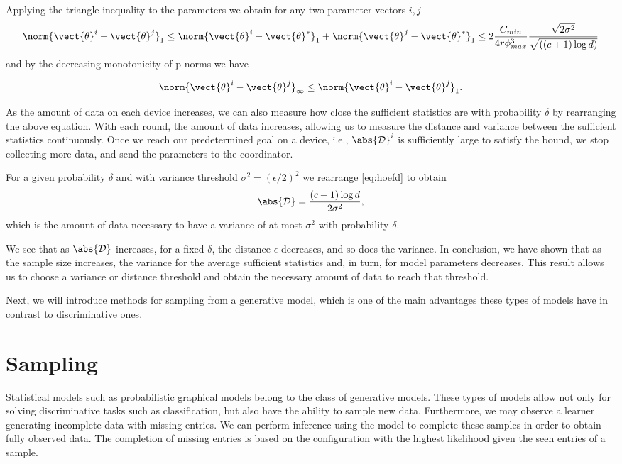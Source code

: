 Applying the triangle inequality to the parameters we obtain for any two parameter vectors $i,j$
\begin{equation}
    \norm{\vect{\theta}^i- \vect{\theta}^j}_1 \leq  \norm{\vect{\theta}^i - \vect{\theta}^*}_1  +  \norm{\vect{\theta}^j- \vect{\theta}^*}_1 \leq 2 \frac{C_{min}}{4r\phi^3_{max}} \frac{\sqrt{2\sigma^2}}{\sqrt{((c+1) \log d)}}
\end{equation}
and by the decreasing monotonicity of p-norms \cite{raissouli2010various} we have

\begin{equation}
    \norm{\vect{\theta}^i- \vect{\theta}^j}_{\infty}  \leq \norm{\vect{\theta}^i- \vect{\theta}^j}_1.
\end{equation}

As the amount of data on each device increases, we can also measure how close the sufficient statistics are with probability $\delta$ by rearranging the above equation. 
With each round, the amount of data increases, allowing us to measure the distance and variance between the sufficient statistics continuously.
Once we reach our predetermined goal on a device, i.e., $\abs{\mathcal{D}}^i$ is sufficiently large to satisfy the bound, we stop collecting more data, and send the parameters to the coordinator.

For a given probability $\delta$ and with variance threshold $\sigma^2 = (\epsilon/2)^2$ we rearrange \autoref{eq:hoefd} to obtain 
\begin{equation}
    \abs{\mathcal{D}} = \frac{(c+1) \log d}{2 \sigma^2},
\end{equation} 
which is the amount of data necessary to have a variance of at most $\sigma^2$ with probability $\delta$.

We see that as $\abs{\mathcal{D}}$ increases, for a fixed $\delta$, the distance $\epsilon$ decreases, and so does the variance. 
In conclusion, we have shown that as the sample size increases, the variance for the average sufficient statistics and, in turn, for model parameters decreases.
This result allows us to choose a variance or distance threshold and obtain the necessary amount of data to reach that threshold.

Next, we will introduce methods for sampling from a generative model, which is one of the main advantages these types of models have in contrast to discriminative ones.

\section{Sampling}
\label{sec:sampling}
Statistical models such as probabilistic graphical models belong to the class of generative models.
These types of models allow not only for solving discriminative tasks such as classification, but also have the ability to sample new data.
Furthermore, we may observe a learner generating incomplete data with missing entries.
We can perform inference using the model to complete these samples in order to obtain fully observed data.
The completion of missing entries is based on the configuration with the highest likelihood given the seen entries of a sample.

